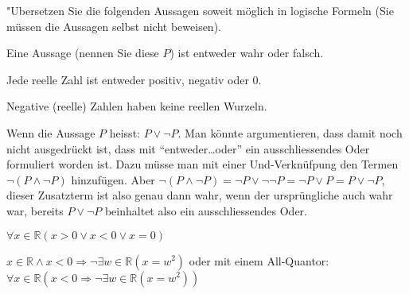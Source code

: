 "Ubersetzen Sie die folgenden Aussagen soweit möglich in
logische Formeln (Sie müssen die Aussagen selbst nicht beweisen).
\begin{teilaufgaben}
\item Eine Aussage (nennen Sie diese $P$) ist entweder wahr oder falsch.
\item Jede reelle Zahl ist entweder positiv, negativ oder $0$.
\item Negative (reelle) Zahlen haben keine reellen Wurzeln.
\end{teilaufgaben}


\begin{loesung}
\begin{teilaufgaben}
\item Wenn die Aussage $P$ heisst: $P\vee\neg P$.
Man könnte argumentieren, dass damit noch nicht ausgedrückt ist,
dass mit ``entweder\dots oder'' ein ausschliessendes Oder formuliert
worden ist. Dazu müsse man mit einer Und-Verknüfpung den Termen
$\neg(P\wedge \neg P)$
hinzufügen. Aber
$\neg(P\wedge \neg P)=\neg P\vee \neg\neg P=\neg P\vee P=P\vee\neg P$,
dieser Zusatzterm ist also genau dann wahr, wenn der ursprüngliche
auch wahr war, bereits $P\vee \neg P$ beinhaltet also ein ausschliessendes
Oder.
\item $\forall x\in\mathbb R(x > 0\vee x<0\vee x=0)$
\item $x\in\mathbb R\wedge x < 0\Rightarrow
\neg\exists w\in\mathbb R(x=w^2)$
oder mit einem All-Quantor: $\forall x\in\mathbb R(x<0\Rightarrow
\neg\exists w\in\mathbb R(x=w^2))$
\qedhere
\end{teilaufgaben}
\end{loesung}

